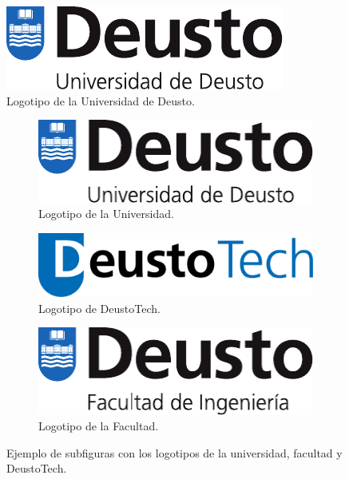 \documentclass{DeustoFDP}
\begin{document}
\begin{figure}
  \centering
  \includegraphics{fig/ud}
  \caption{Logotipo de la Universidad de Deusto.}\label{fig:ud}
\end{figure}

\begin{figure}[h]
  \centering
  \begin{subfigure}{.3\textwidth}
    \centering
    \includegraphics[width=\textwidth]{fig/ud}
    \caption{Logotipo de la Universidad.}\label{subfig:ud}
  \end{subfigure}\quad
  \begin{subfigure}{.3\textwidth}
    \centering
    \includegraphics[width=\textwidth]{fig/dt}
    \caption{Logotipo de DeustoTech.}\label{subfig:dt}
  \end{subfigure}\quad
  \begin{subfigure}{.3\textwidth}
    \centering
    \includegraphics[width=\textwidth]{fig/ESIDE}
    \caption{Logotipo de la Facultad.}\label{subfig:ESIDE}
  \end{subfigure}
  \caption{Ejemplo de subfiguras con los logotipos de la universidad, facultad
           y DeustoTech.}\label{fig:logotipos}
\end{figure}
\end{document}
